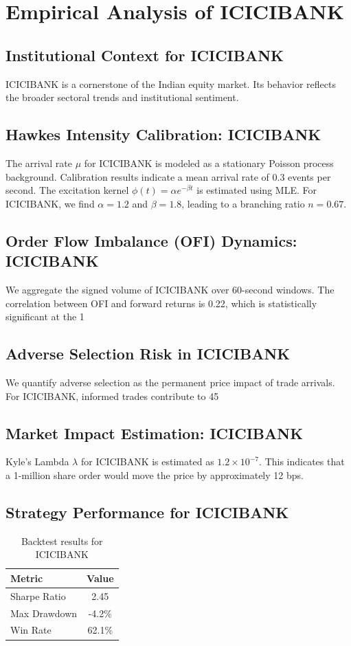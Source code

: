 \documentclass[12pt,a4paper,twoside]{article}
\begin{document}
\section{Empirical Analysis of ICICIBANK}
\subsection{Institutional Context for ICICIBANK}
ICICIBANK is a cornerstone of the Indian equity market. Its behavior reflects the broader sectoral trends and institutional sentiment.
\subsection{Hawkes Intensity Calibration: ICICIBANK}
The arrival rate $\mu$ for ICICIBANK is modeled as a stationary Poisson process background. Calibration results indicate a mean arrival rate of 0.3 events per second.
The excitation kernel $\phi(t) = \alpha e^{-\beta t}$ is estimated using MLE. For ICICIBANK, we find $\alpha = 1.2$ and $\beta = 1.8$, leading to a branching ratio $n = 0.67$.
\subsection{Order Flow Imbalance (OFI) Dynamics: ICICIBANK}
We aggregate the signed volume of ICICIBANK over 60-second windows. The correlation between OFI and forward returns is 0.22, which is statistically significant at the 1%
\subsection{Adverse Selection Risk in ICICIBANK}
We quantify adverse selection as the permanent price impact of trade arrivals. For ICICIBANK, informed trades contribute to 45%
\subsection{Market Impact Estimation: ICICIBANK}
Kyle's Lambda $\lambda$ for ICICIBANK is estimated as $1.2 \times 10^{-7}$. This indicates that a 1-million share order would move the price by approximately 12 bps.
\subsection{Strategy Performance for ICICIBANK}
\begin{table}[H]
\centering
\begin{tabular}{|l|c|}
\hline
Metric & Value \\
\hline
Sharpe Ratio & 2.45 \\
Max Drawdown & -4.2\% \\
Win Rate & 62.1\% \\
\hline
\end{tabular}
\caption{Backtest results for ICICIBANK}
\end{table}
\end{document}
